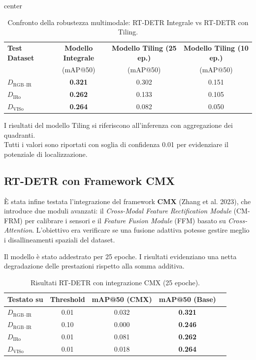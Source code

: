 \documentclass[a4paper,11pt]{article}
\begin{document}
\begin{table}[h]
\centering
\caption{Confronto della robustezza multimodale: RT-DETR Integrale vs RT-DETR con Tiling.}
\label{tab:rtdetr_comparison_final}
\begin{adjustbox}{center}
\begin{tabular}{lccc}
\toprule
\textbf{Test Dataset} & \textbf{Modello Integrale} & \textbf{Modello Tiling (25 ep.)} & \textbf{Modello Tiling (10 ep.)}\\
& (mAP@50) & (mAP@50) & (mAP@50) \\
\midrule
$D_{\text{RGB--IR}}$ & \textbf{0.321} & 0.302 & 0.151 \\
$D_{\text{IRo}}$ & \textbf{0.262} & 0.133 & 0.105 \\
$D_{\text{VISo}}$ & \textbf{0.264} & 0.082 & 0.050\\
\bottomrule
\end{tabular}
\end{adjustbox}
\par\smallskip
\small *I risultati del modello Tiling si riferiscono all'inferenza con aggregazione dei quadranti. \\
Tutti i valori sono riportati con soglia di confidenza 0.01 per evidenziare il potenziale di localizzazione.
\end{table}


\subsection{RT-DETR con Framework CMX}
È stata infine testata l'integrazione del framework \textbf{CMX} (Zhang et al. 2023), che introduce due moduli avanzati: il \emph{Cross-Modal Feature Rectification Module} (CM-FRM) per calibrare i sensori e il \emph{Feature Fusion Module} (FFM) basato su \emph{Cross-Attention}. L'obiettivo era verificare se una fusione adattiva potesse gestire meglio i disallineamenti spaziali del dataset.

Il modello è stato addestrato per 25 epoche. I risultati evidenziano una netta degradazione delle prestazioni rispetto alla somma additiva.

\begin{table}[h]
\centering
\caption{Risultati RT-DETR con integrazione CMX (25 epoche).}
\label{tab:rtdetr_cmx}
\begin{tabular}{lcccc}
\toprule
Testato su & Threshold & mAP@50 (CMX) & mAP@50 (Base) \\
\midrule
$D_{\text{RGB--IR}}$ & 0.01 & 0.032 & \textbf{0.321} \\
$D_{\text{RGB--IR}}$ & 0.10 & 0.000 & \textbf{0.246} \\
\midrule
$D_{\text{IRo}}$ & 0.01 & 0.081 & \textbf{0.262} \\
$D_{\text{VISo}}$ & 0.01 & 0.018 & \textbf{0.264} \\
\bottomrule
\end{tabular}
\end{table}
\end{document}

